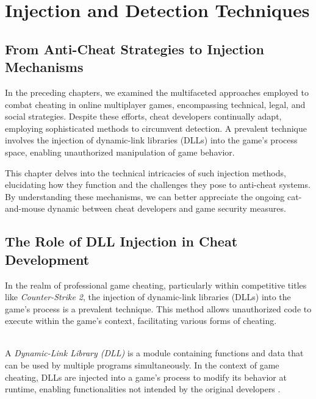 \chapter{Injection and Detection Techniques}

\section*{From Anti-Cheat Strategies to Injection Mechanisms}

In the preceding chapters, we examined the multifaceted approaches employed to combat cheating in online multiplayer games, encompassing technical, legal, and social strategies. Despite these efforts, cheat developers continually adapt, employing sophisticated methods to circumvent detection. A prevalent technique involves the injection of dynamic-link libraries (DLLs) into the game's process space, enabling unauthorized manipulation of game behavior.

This chapter delves into the technical intricacies of such injection methods, elucidating how they function and the challenges they pose to anti-cheat systems. By understanding these mechanisms, we can better appreciate the ongoing cat-and-mouse dynamic between cheat developers and game security measures.

\section{The Role of DLL Injection in Cheat Development}

In the realm of professional game cheating, particularly within competitive titles like \textit{Counter-Strike 2}, the injection of dynamic-link libraries (DLLs) into the game's process is a prevalent technique. This method allows unauthorized code to execute within the game's context, facilitating various forms of cheating.

\begin{tcolorbox}[colback=gray!10, colframe=gray!50, boxrule=0pt, sharp corners, width=\linewidth, left=1mm, right=1mm, top=0.5mm, bottom=0.5mm]
 \\
A \textit{Dynamic-Link Library (DLL)} is a module containing functions and data that can be used by multiple programs simultaneously. In the context of game cheating, DLLs are injected into a game's process to modify its behavior at runtime, enabling functionalities not intended by the original developers \parencite{mitre2025dllinjection}.
\end{tcolorbox}

